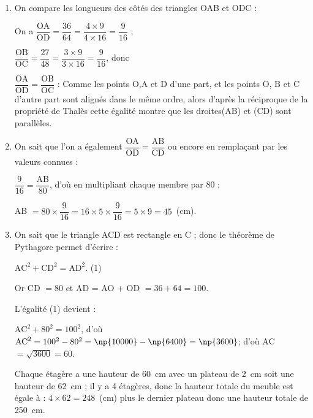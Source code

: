 
\medskip

\begin{enumerate}
\item On compare les longueurs des côtés des triangles OAB et ODC :

On a $\dfrac{\text{OA}}{\text{OD}} = \dfrac{36}{64} = \dfrac{4 \times 9}{4 \times 16} = \dfrac{9}{16}$ ;

$\dfrac{\text{OB}}{\text{OC}} = \dfrac{27}{48} = \dfrac{3 \times 9}{3 \times 16} = \dfrac{9}{16}$, donc 

$\dfrac{\text{OA}}{\text{OD}} = \dfrac{\text{OB}}{\text{OC}}$ : Comme les points O,A et D d'une part, et les points O, B et C d'autre part sont alignés dans le même ordre,
alors d'après la réciproque de la propriété de Thalès cette égalité montre que les droites(AB) et (CD) sont parallèles.
\item On sait que l'on a également $\dfrac{\text{OA}}{\text{OD}} =\dfrac{\text{AB}}{\text{CD}}$ ou encore en remplaçant par les valeurs connues :

$\dfrac{9}{16} = \dfrac{\text{AB}}{80}$, d'où en multipliant chaque membre par 80 : 

AB $ = 80 \times \dfrac{9}{16} = 16 \times 5 \times \dfrac{9}{16} = 5 \times 9 = 45$~(cm).
\item On sait que le triangle ACD est rectangle en C ; donc le théorème de Pythagore permet d'écrire :

$\text{AC}^2 + \text{CD}^2 = \text{AD}^2$. \quad (1)

Or CD $ = 80$ et AD = AO + OD $= 36 + 64 = 100$.

L'égalité (1) devient :

$\text{AC}^2 + 80^2 = 100^2$, d'où $\text{AC}^2 = 100^2 - 80^2 = \np{10000} - \np{6400} = \np{3600}$; d'où AC $ = \sqrt{3600} = 60$.

Chaque étagère a une hauteur de 60~cm avec un plateau de 2~cm soit une hauteur de 62~cm ; il y a 4 étagères, donc la hauteur totale du meuble est égale à : $4 \times 62 = 248$~(cm) plus le dernier plateau donc une hauteur totale de 250~cm.
\end{enumerate}

\vspace{0,5cm}

